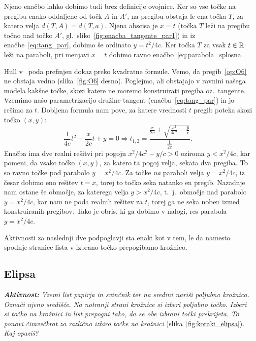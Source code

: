 Njeno enačbo lahko dobimo tudi brez definicije ovojnice. Ker so vse točke na pregibu enako oddaljene od točk $A$ in $A'$, na pregibu obstaja le ena točka $T$, za katero velja $d(T, A) = d(T, a)$. Njena abscisa je $x = t$ (točka $T$ leži na pregibu točno nad točko $A'$, gl.\ sliko~\ref{fig:enacba_tangente_par1}) in iz enačbe~\eqref{eq:tang_par}, dobimo še ordinato $y = t^2/4c$. Ker točka $T$ za vsak $t \in \mathbb R$ leži na paraboli, pri menjavi $x = t$ dobimo ravno enačbo~\eqref{eq:parabola_splosna}.

Hull v~\cite[str.\ 55--56]{hull2013} poda prefinjen dokaz preko kvadratne formule. Vemo, da pregib~\ref{op:O6} ne obstaja vedno (slika~\ref{fig:O6} desno). Poglejmo, ali obstajajo v ravnini našega modela kakšne točke, skozi katere ne moremo konstruirati pregiba oz.\ tangente. Vzemimo našo parametrizacijo družine tangent (enačba~\eqref{eq:tang_par}) in jo rešimo za $t$. Dobljena formula nam pove, za katere vrednosti $t$ pregib poteka skozi točko $(x, y)$:
$$ \frac{1}{4c}t^2 - \frac{x}{2c}t + y = 0 \Rightarrow t_{1,2} = \frac{\frac{x}{2c} \pm \sqrt{\frac{x^2}{4c^2} - \frac{y}{c}}}{\frac{1}{2c}}.$$
Enačba ima dve realni rešitvi pri pogoju $x^2 / 4c^2 - y/c > 0$ oziroma $y < x^2 / 4c$, kar pomeni, da vsako točko $(x, y)$, za katero ta pogoj velja, sekata dva pregiba. To so ravno točke pod parabolo $y = x^2 / 4c$. Za točke \emph{na} paraboli velja $y = x^2 / 4c$, iz česar dobimo eno rešitev $t = x$, torej to točko seka natanko en pregib. Nazadnje nam ostane še območje, za katerega velja $y > x^2 / 4c$, t.\ j.\ območje nad parabolo $y = x^2 / 4c$, kar nam ne poda realnih rešitev za $t$, torej ga ne seka noben izmed konstruiranih pregibov. Tako je obris, ki ga dobimo v nalogi, res parabola $y = x^2 / 4c$.

Aktivnosti za naslednji dve podpoglavji sta enaki kot v tem, le da namesto spodnje stranice lista v izbrano točko prepogibamo krožnico.

\subsection{Elipsa}

\textit{\textbf{Aktivnost:} Vzemi list papirja in svinčnik ter na sredini nariši poljubno krožnico. Označi njeno središče. Na notranji strani krožnice si izberi poljubno točko. Izberi si točko na krožnici in list prepogni tako, da se obe izbrani točki prekrijeta. To ponovi čimvečkrat za različno izbiro točke na krožnici} (slika~\ref{fig:koraki_elipsa}). \textit{Kaj opaziš?}

